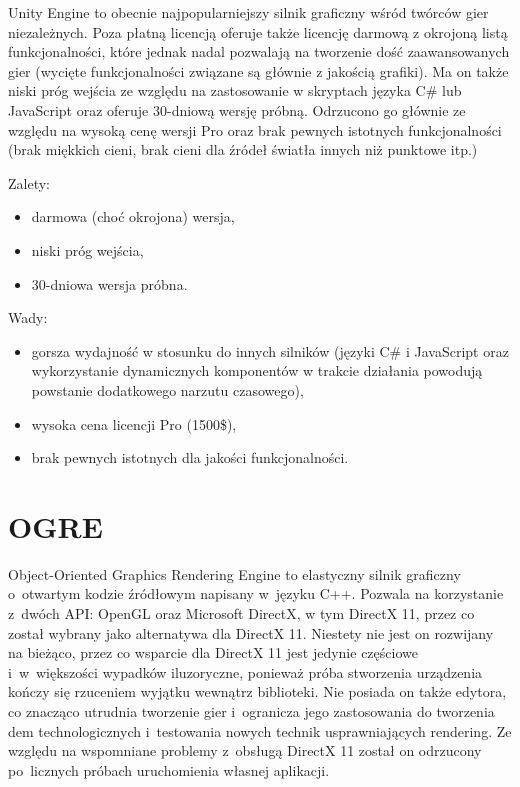 Unity Engine to obecnie najpopularniejszy silnik graficzny wśród twórców gier niezależnych. Poza płatną licencją oferuje także licencję darmową z okrojoną listą funkcjonalności, które jednak nadal pozwalają na tworzenie dość zaawansowanych gier (wycięte funkcjonalności związane są głównie z jakością grafiki). Ma on także niski próg wejścia ze względu na zastosowanie w skryptach języka C\# lub JavaScript oraz oferuje 30-dniową wersję próbną. Odrzucono go głównie ze względu na wysoką cenę wersji Pro oraz brak pewnych istotnych funkcjonalności (brak miękkich cieni, brak cieni dla źródeł światła innych niż punktowe itp.)\\

{\raggedright Zalety:
\begin{itemize}
\item darmowa (choć okrojona) wersja,
\item niski próg wejścia,
\item 30-dniowa wersja próbna.
\end{itemize}

Wady:
\begin{itemize}
\item gorsza wydajność w stosunku do innych silników (języki C\# i JavaScript oraz wykorzystanie dynamicznych komponentów w trakcie działania powodują powstanie dodatkowego narzutu czasowego),
\item wysoka cena licencji Pro (1500\$),
\item brak pewnych istotnych dla jakości funkcjonalności.
\end{itemize}
}
\section{OGRE}

Object-Oriented Graphics Rendering Engine to elastyczny silnik graficzny o~otwartym kodzie źródłowym napisany w~języku C++. Pozwala na korzystanie z~dwóch API: OpenGL oraz Microsoft DirectX, w tym DirectX 11, przez co został wybrany jako alternatywa dla DirectX 11. Niestety nie jest on rozwijany na bieżąco, przez co wsparcie dla DirectX 11 jest jedynie częściowe i~w~większości wypadków iluzoryczne, ponieważ próba stworzenia urządzenia kończy się rzuceniem wyjątku wewnątrz biblioteki. Nie posiada on także edytora, co znacząco utrudnia tworzenie gier i~ogranicza jego zastosowania do tworzenia dem technologicznych i~testowania nowych technik usprawniających rendering. Ze względu na wspomniane problemy z~obsługą DirectX 11 został on odrzucony po~licznych próbach uruchomienia własnej aplikacji.\\

